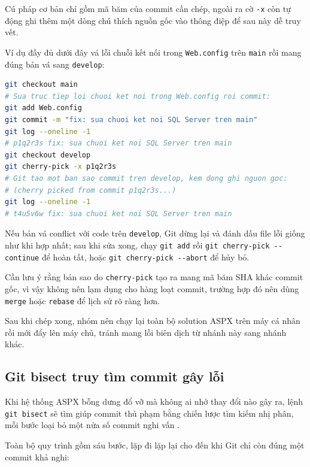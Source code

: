 Cú pháp cơ bản chỉ gồm mã băm của commit cần chép, ngoài ra cờ \verb|-x| còn tự động ghi thêm một dòng chú thích nguồn gốc vào thông điệp để sau này dễ truy vết.

Ví dụ đầy đủ dưới đây vá lỗi chuỗi kết nối trong \verb|Web.config| trên \verb|main| rồi mang đúng bản vá sang \verb|develop|:

\begin{lstlisting}[language=bash, caption={Chep mot commit va nong tu main sang develop}, label={lst:c32-cherry-pick}]
git checkout main
# Sua truc tiep loi chuoi ket noi trong Web.config roi commit:
git add Web.config
git commit -m "fix: sua chuoi ket noi SQL Server tren main"
git log --oneline -1
# p1q2r3s fix: sua chuoi ket noi SQL Server tren main
git checkout develop
git cherry-pick -x p1q2r3s
# Git tao mot ban sao commit tren develop, kem dong ghi nguon goc:
# (cherry picked from commit p1q2r3s...)
git log --oneline -1
# t4u5v6w fix: sua chuoi ket noi SQL Server tren main
\end{lstlisting}

Nếu bản vá conflict với code trên \verb|develop|, Git dừng lại và đánh dấu file lỗi giống như khi hợp nhất; sau khi sửa xong, chạy \verb|git add| rồi \verb|git cherry-pick --continue| để hoàn tất, hoặc \verb|git cherry-pick --abort| để hủy bỏ.

Cần lưu ý rằng bản sao do \verb|cherry-pick| tạo ra mang mã băm SHA khác commit gốc, vì vậy không nên lạm dụng cho hàng loạt commit, trường hợp đó nên dùng \verb|merge| hoặc \verb|rebase| để lịch sử rõ ràng hơn.

Sau khi chép xong, nhóm nên chạy lại toàn bộ solution ASPX trên máy cá nhân rồi mới đẩy lên máy chủ, tránh mang lỗi biên dịch từ nhánh này sang nhánh khác.

\subsection{Git bisect truy tìm commit gây lỗi}
\label{sec:c32-bisect}

Khi hệ thống ASPX bỗng dưng đổ vỡ mà không ai nhớ thay đổi nào gây ra, lệnh \verb|git bisect| sẽ tìm giúp commit thủ phạm bằng chiến lược tìm kiếm nhị phân, mỗi bước loại bỏ một nửa số commit nghi vấn \cite{progit}.

Toàn bộ quy trình gồm sáu bước, lặp đi lặp lại cho đến khi Git chỉ còn đúng một commit khả nghi:

